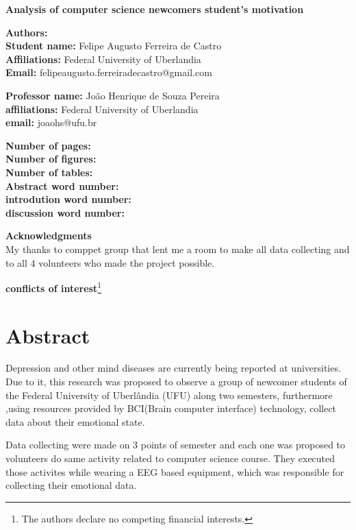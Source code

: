 \documentclass[12pt,openright,a4paper]{article}
\begin{document}
	\linespread{1.5}
 \fontsize{16}{10}\selectfont \centering \textbf{Analysis of computer science newcomers student's motivation} \\
	\fontsize{14}{10}\selectfont {Analysis of student's motivation}\newline

\fontsize{12}{10}
\flushleft
	\textbf{Authors:}\\
	\textbf{Student name:} Felipe Augusto Ferreira de Castro\\
	\textbf{Affiliations:} Federal University of Uberlandia\\
	\textbf{Email:} felipeaugusto.ferreiradecastro@gmail.com \newline
	
\textbf{Professor name:} João Henrique de Souza Pereira\\
\textbf{affiliations:} Federal University of Uberlandia\\
\textbf{email:} joaohs@ufu.br\newline

\textbf{Number of pages:}\\
\textbf{Number of figures:}\\
\textbf{Number of tables:}\\
\textbf{Abstract word number:}\\
\textbf{introdution word number:}\\
\textbf{discussion word number:}\newline
	
\textbf{Acknowledgments}\\	
My thanks to comppet group that lent me a room to make all data collecting and to all 4 volunteers who made the project possible.\newline

\textbf{conflicts of interest}\footnote{The authors declare no competing financial interests.}

\newpage
\tableofcontents
\newpage
\section{Abstract}
Depression and other mind diseases are currently being reported at universities. Due to it, this research was proposed to observe a group of newcomer students of the Federal University of Uberlândia (UFU) along two semesters, furthermore ,using resources provided by BCI(Brain computer interface)  technology, collect data about their emotional state.

Data collecting were made on 3 points of semester and each one was proposed to volunteers do same activity related to computer science course. They executed those activites  while wearing a EEG based equipment, which was responsible for collecting their emotional data.
\end{document}
